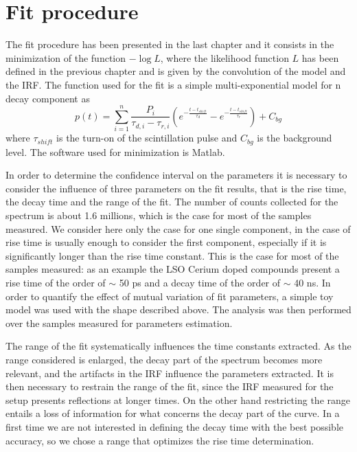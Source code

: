 \section{Fit procedure}
The fit procedure has been presented in the last chapter and it consists in the minimization of the function $-\log{L}$, where the likelihood function $L$ has been defined in the previous chapter and is given by the convolution of the model and the IRF.
The function used for the fit is a simple multi-exponential model for n decay component as
\begin{equation}
p(t) = \sum _{i = 1}^{n} \frac{P_{i}}{\tau _{d, i} - \tau _{r, i}}\left( e^{-\frac{t-t_{shift}}{\tau _{d}}} - e^{-\frac{t-t_{shift}}{\tau _{r}}} \right) + C_{bg}
\end{equation}
where $\tau _{shift}$ is the turn-on of the scintillation pulse and $C_{bg}$ is the background level.
The software used for minimization is Matlab.

In order to determine the confidence interval on the parameters it is necessary to consider the influence of three parameters on the fit results, that is the rise time, the decay time and the range of the fit. 
The number of counts collected for the spectrum is about 1.6 millions, which is the case for most of the samples measured. 
We consider here only the case for one single component, in the case of rise time is usually enough to consider the first component, especially if it is significantly longer than the rise time constant. This is the case for most of the samples measured: as an example the LSO Cerium doped compounds present a rise time of the order of $\sim$ 50 ps and a decay time of the order of $\sim$ 40 ns.
In order to quantify the effect of mutual variation of fit parameters, a simple toy model was used with the shape described above. The analysis was then performed over the samples measured for parameters estimation.

The range of the fit systematically influences the time constants extracted. As the range considered is enlarged, the  decay part of the spectrum becomes more relevant, and the artifacts in the IRF influence the parameters extracted. 
It is then necessary to restrain the range of the fit, since the IRF measured for the setup presents reflections at longer times. On the other hand restricting the range  entails a loss of information for what concerns the decay part of the curve. In a first time we are not interested in defining the decay time with the best possible accuracy, so we chose a range that optimizes the rise time determination.

